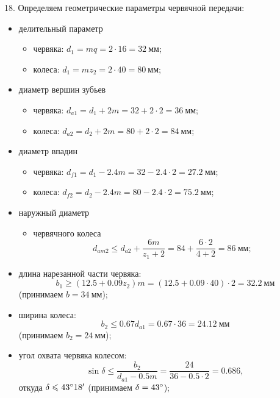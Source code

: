 18. Определяем геометрические параметры червячной передачи:
\begin{itemize}
    \item делительный параметр
        \begin{itemize}
            \item червяка: $d_1 = m q = 2 \cdot 16 = 32~мм$;
            \item колеса: $d_1 = m z_2 = 2 \cdot 40 = 80~мм$;
        \end{itemize}
    \item диаметр вершин зубьев
        \begin{itemize}
            \item червяка: $d_{a1} = d_1 + 2m = 32 + 2 \cdot 2 = 36~мм$;
            \item колеса: $d_{a2} = d_2 + 2m = 80 + 2 \cdot 2 = 84~мм$;
        \end{itemize}
    \item диаметр впадин
        \begin{itemize}
            \item червяка: $d_{f1} = d_1 - 2.4 m = 32 - 2.4 \cdot 2 = 27.2~мм$;
            \item колеса: $d_{f2} = d_2 - 2.4 m = 80 - 2.4 \cdot 2 = 75.2~мм$;
        \end{itemize}
    \item наружный диаметр
        \begin{itemize}
            \item червячного колеса
                \[
                    d_{am2} \le d_{a2} + \frac{6m}{z_1 + 2}
                            = 84 + \frac{6 \cdot 2}{4 + 2}
                            = 86~мм;
                \]
        \end{itemize}
    \item длина нарезанной части червяка:
        \[
            b_1 \ge (12.5 + 0.09 z_2) m
                = (12.5 + 0.09 \cdot 40) \cdot 2
                = 32.2~мм 
        \]
        (принимаем $b = 34~мм$);
    \item ширина колеса:
        \[
            b_2 \le 0.67 d_{a1}
                = 0.67 \cdot 36
                = 24.12~мм
        \]
        (принимаем $b_2 = 24~мм$);
    \item угол охвата червяка колесом:
        \[
            \sin \delta \le \frac{b_2}{d_{a1} - 0.5m}
                        = \frac{24}{36 - 0.5 \cdot 2}
                        = 0.686,
        \]
        откуда $\delta \leqslant 43\degree 18'$ (принимаем $\delta = 43\degree$);
\end{itemize}

